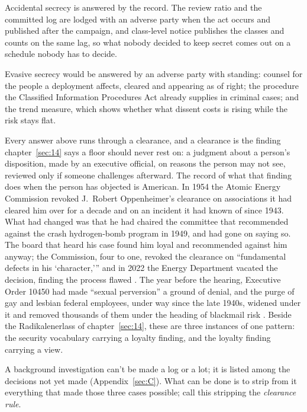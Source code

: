 Accidental secrecy is answered by the record. The review ratio and the committed log are lodged with an adverse party when the act occurs and published after the campaign, and class-level notice publishes the classes and counts on the same lag, so what nobody decided to keep secret comes out on a schedule nobody has to decide.

Evasive secrecy would be answered by an adverse party with standing: counsel for the people a deployment affects, cleared and appearing as of right; the procedure the Classified Information Procedures Act already supplies in criminal cases; and the trend measure, which shows whether what dissent costs is rising while the risk stays flat.


Every answer above runs through a clearance, and a clearance is the finding chapter~\ref{sec:14} says a floor should never rest on: a judgment about a person's disposition, made by an executive official, on reasons the person may not see, reviewed only if someone challenges afterward. The record of what that finding does when the person has objected is American. In 1954 the Atomic Energy Commission revoked J.~Robert Oppenheimer's clearance on associations it had cleared him over for a decade and on an incident it had known of since 1943. What had changed was that he had chaired the committee that recommended against the crash hydrogen-bomb program in 1949, and had gone on saying so. The board that heard his case found him loyal and recommended against him anyway; the Commission, four to one, revoked the clearance on “fundamental defects in his ‘character,’” and in 2022 the Energy Department vacated the decision, finding the process flawed \autocite{aec1954transcript,aec1954decision,doe2022oppenheimer}. The year before the hearing, Executive Order 10450 had made “sexual perversion” a ground of denial, and the purge of gay and lesbian federal employees, under way since the late 1940s, widened under it and removed thousands of them under the heading of blackmail risk \autocite{eo10450,johnson2004lavender}. Beside the Radikalenerlass of chapter~\ref{sec:14}, these are three instances of one pattern: the security vocabulary carrying a loyalty finding, and the loyalty finding carrying a view.

A background investigation can't be made a log or a lot; it is listed among the decisions not yet made (Appendix~\ref{sec:C}). What can be done is to strip from it everything that made those three cases possible; call this stripping the \emph{clearance rule}.

